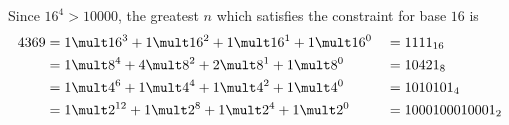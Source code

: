 Since $16^{4}>10000$, the greatest $n$ which satisfies the constraint for base $16$ is
\begin{alignat*}{2}
4369 
 & = 1 \mult 16^{3} + 1 \mult 16^{2} + 1 \mult 16^{1} + 1 \mult 16^{0}
 && = 1111_{16}
\\
 & = 1 \mult 8^{4} + 4 \mult 8^{2} + 2 \mult 8^{1} + 1 \mult 8^{0}
 && = 10421_{8}
\\
 & = 1 \mult 4^{6} + 1 \mult 4^{4} + 1 \mult 4^{2} + 1 \mult 4^{0} 
 && = 1010101_{4}
\\
 & = 1 \mult 2^{12} + 1 \mult 2^{8} + 1 \mult 2^{4} + 1 \mult 2^{0}
 && = 1000100010001_{2}
\end{alignat*}
